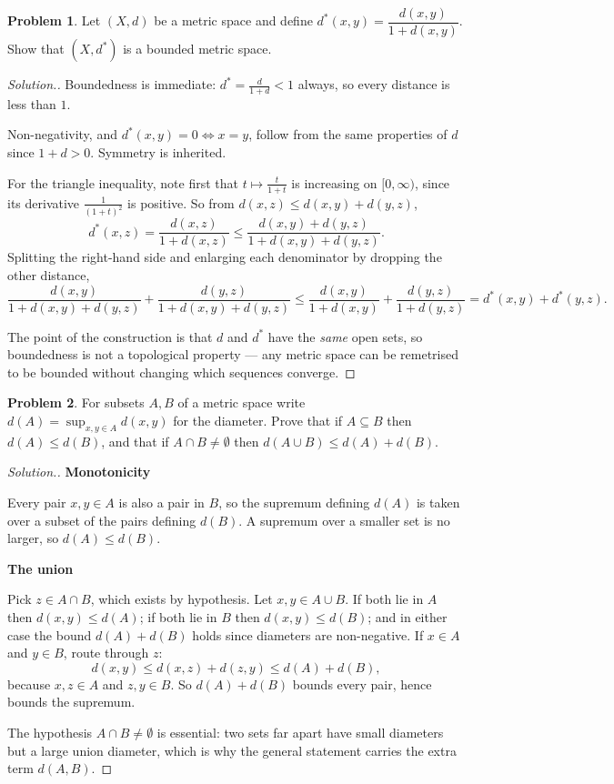 \documentclass[11pt,a4paper]{article}
\theoremstyle{definition}
\newtheorem{problemx}{Problem}[section]
\newenvironment{problem}{\begin{problemx}}{\end{problemx}}
\newenvironment{solution}
  {\renewcommand{\qedsymbol}{}\begin{proof}[\textit{Solution}.]}
  {\end{proof}}
\newcommand{\subhead}[1]{%
  \par\medskip\noindent\textbf{#1}\par\nobreak\smallskip}
\begin{document}
\begin{problem}
Let $(X,d)$ be a metric space and define
$d^*(x,y)=\dfrac{d(x,y)}{1+d(x,y)}$. Show that $(X,d^*)$ is a bounded metric
space.
\end{problem}
\begin{solution}
Boundedness is immediate: $d^*=\frac{d}{1+d}<1$ always, so every distance is
less than $1$.

Non-negativity, and $d^*(x,y)=0\iff x=y$, follow from the same properties of
$d$ since $1+d>0$. Symmetry is inherited.

For the triangle inequality, note first that $t\mapsto\frac{t}{1+t}$ is
increasing on $[0,\infty)$, since its derivative $\frac{1}{(1+t)^2}$ is
positive. So from $d(x,z)\leq d(x,y)+d(y,z)$,
$$d^*(x,z)=\frac{d(x,z)}{1+d(x,z)}\leq\frac{d(x,y)+d(y,z)}{1+d(x,y)+d(y,z)} .$$
Splitting the right-hand side and enlarging each denominator by dropping the
other distance,
$$\frac{d(x,y)}{1+d(x,y)+d(y,z)}+\frac{d(y,z)}{1+d(x,y)+d(y,z)}
\leq\frac{d(x,y)}{1+d(x,y)}+\frac{d(y,z)}{1+d(y,z)}=d^*(x,y)+d^*(y,z).$$

The point of the construction is that $d$ and $d^*$ have the \emph{same} open
sets, so boundedness is not a topological property --- any metric space can be
remetrised to be bounded without changing which sequences converge.
\end{solution}

\begin{problem}
For subsets $A,B$ of a metric space write $d(A)=\sup_{x,y\in A}d(x,y)$ for the
diameter. Prove that if $A\subseteq B$ then $d(A)\leq d(B)$, and that if
$A\cap B\neq\emptyset$ then $d(A\cup B)\leq d(A)+d(B)$.
\end{problem}
\begin{solution}
\subhead{Monotonicity}
Every pair $x,y\in A$ is also a pair in $B$, so the supremum defining $d(A)$ is
taken over a subset of the pairs defining $d(B)$. A supremum over a smaller set
is no larger, so $d(A)\leq d(B)$.

\subhead{The union}
Pick $z\in A\cap B$, which exists by hypothesis. Let $x,y\in A\cup B$. If both
lie in $A$ then $d(x,y)\leq d(A)$; if both lie in $B$ then $d(x,y)\leq d(B)$;
and in either case the bound $d(A)+d(B)$ holds since diameters are
non-negative. If $x\in A$ and $y\in B$, route through $z$:
$$d(x,y)\leq d(x,z)+d(z,y)\leq d(A)+d(B),$$
because $x,z\in A$ and $z,y\in B$. So $d(A)+d(B)$ bounds every pair, hence
bounds the supremum.

The hypothesis $A\cap B\neq\emptyset$ is essential: two sets far apart have
small diameters but a large union diameter, which is why the general statement
carries the extra term $d(A,B)$.
\end{solution}
\end{document}
